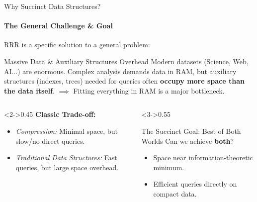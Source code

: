\begin{frame}{Why Succinct Data Structures?}
    \framesubtitle{The General Challenge \& Goal}

    RRR is a specific solution to a general problem:
    \begin{block}{Massive Data \& Auxiliary Structures Overhead}
        Modern datasets (Science, Web, AI...) are enormous. Complex analysis demands data in RAM, but auxiliary structures (indexes, trees) needed for queries often \textbf{occupy more space than the data itself}.
        $\implies$ Fitting everything in RAM is a major bottleneck.
    \end{block}
    \pause
    \begin{columns}[T]
        \begin{column}<2->{0.45\textwidth}
            \textbf{Classic Trade-off:}
            \begin{itemize}
                \item \textit{Compression:} Minimal space, but slow/no direct queries.
                \item \textit{Traditional Data Structures:} Fast queries, but large space overhead.
            \end{itemize}
        \end{column}
        \begin{column}<3->{0.55\textwidth}
            \begin{alertblock}{The Succinct Goal: Best of Both Worlds}
                Can we achieve \textbf{both}?
                \begin{itemize}
                    \item Space \alert{near information-theoretic minimum}.
                    \item Efficient queries \alert{directly} on compact data.
                \end{itemize}
            \end{alertblock}
        \end{column}
    \end{columns}
\end{frame}
